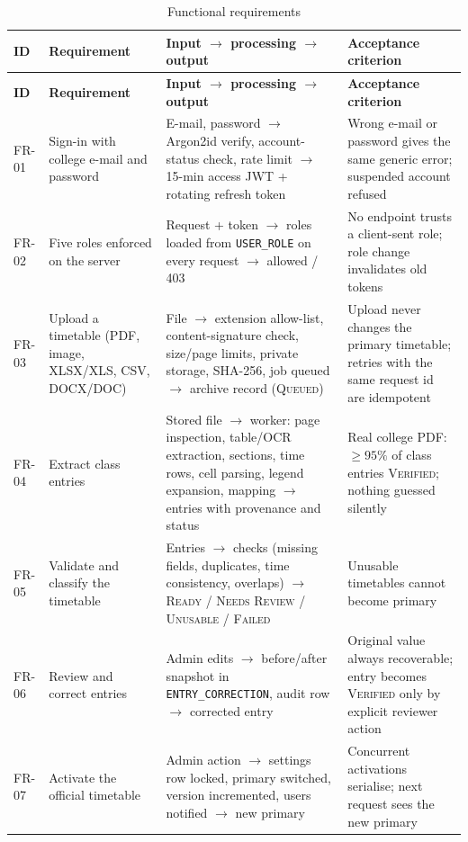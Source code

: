 \begingroup\small
\begin{longtable}{@{}p{1.1cm}p{3.4cm}p{6.2cm}p{4.9cm}@{}}
\caption{Functional requirements}\label{tab:fr}\\
\toprule
\textbf{ID} & \textbf{Requirement} & \textbf{Input $\rightarrow$ processing $\rightarrow$ output} & \textbf{Acceptance criterion}\\
\midrule
\endfirsthead
\toprule
\textbf{ID} & \textbf{Requirement} & \textbf{Input $\rightarrow$ processing $\rightarrow$ output} & \textbf{Acceptance criterion}\\
\midrule
\endhead
FR-01 & Sign-in with college e-mail and password & E-mail, password $\rightarrow$ Argon2id verify, account-status check, rate limit $\rightarrow$ 15-min access JWT + rotating refresh token & Wrong e-mail or password gives the same generic error; suspended account refused\\
FR-02 & Five roles enforced on the server & Request + token $\rightarrow$ roles loaded from \texttt{USER\_ROLE} on every request $\rightarrow$ allowed / 403 & No endpoint trusts a client-sent role; role change invalidates old tokens\\
FR-03 & Upload a timetable (PDF, image, XLSX/XLS, CSV, DOCX/DOC) & File $\rightarrow$ extension allow-list, content-signature check, size/page limits, private storage, SHA-256, job queued $\rightarrow$ archive record (\textsc{Queued}) & Upload never changes the primary timetable; retries with the same request id are idempotent\\
FR-04 & Extract class entries & Stored file $\rightarrow$ worker: page inspection, table/OCR extraction, sections, time rows, cell parsing, legend expansion, mapping $\rightarrow$ entries with provenance and status & Real college PDF: $\geq 95\%$ of class entries \textsc{Verified}; nothing guessed silently\\
FR-05 & Validate and classify the timetable & Entries $\rightarrow$ checks (missing fields, duplicates, time consistency, overlaps) $\rightarrow$ \textsc{Ready} / \textsc{Needs Review} / \textsc{Unusable} / \textsc{Failed} & Unusable timetables cannot become primary\\
FR-06 & Review and correct entries & Admin edits $\rightarrow$ before/after snapshot in \texttt{ENTRY\_CORRECTION}, audit row $\rightarrow$ corrected entry & Original value always recoverable; entry becomes \textsc{Verified} only by explicit reviewer action\\
FR-07 & Activate the official timetable & Admin action $\rightarrow$ settings row locked, primary switched, version incremented, users notified $\rightarrow$ new primary & Concurrent activations serialise; next request sees the new primary\\

\end{longtable}
